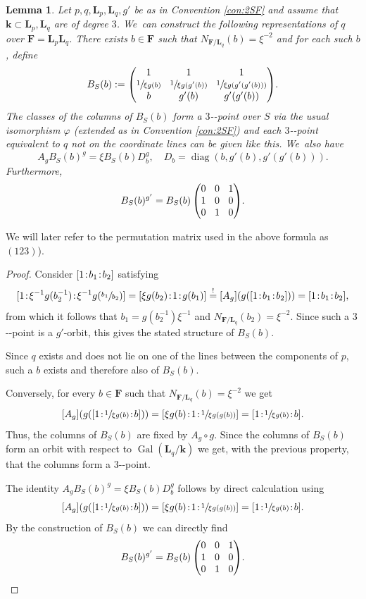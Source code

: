 \documentclass[10pt,a4paper]{amsart}
\providecommand{\nobreakdash}{\nobreak\hbox{-}}
\newcommand{\sep}{\mkern2mu{:}\mkern2mu}
\DeclareMathOperator{\diag}{diag}
\DeclareMathOperator{\Gal}{Gal}
\newtheorem{lemma}[theorem]{Lemma}
\theoremstyle{definition}
\newcommand{\kk}{{\boldsymbol{k}}}
\newcommand{\FF}{{\boldsymbol{F}}}
\newcommand{\LL}{{\boldsymbol{L}}}
\begin{document}
\begin{lemma} \label{3-pointNonEq}
Let $p,q,\LL_p,\LL_q,g'$ be as in Convention \ref{con:2SF} and assume that $\kk \subset \LL_p, \LL_q$ are of degree $3$. We~can construct the following representations of $q$ over $\FF = \LL_p \LL_q$. There exists $b \in \FF$ such that $N_{\FF / \LL_q}(b) = \xi^{-2}$ and for each such $b$, define
\[\arraycolsep4.5pt
B_S(b) := \begin{pmatrix}
1 & 1 & 1 \\
\sfrac{1}{\xi g(b)} & \sfrac{1}{\xi g(g'(b))} & \sfrac{1}{\xi g(g'(g'(b)))} \\
b & g'(b) & g'(g'(b))
\end{pmatrix}\!.
\]
The classes of the columns of $B_S(b)$ form a $3$\nobreakdash-point over $S$ via the usual isomorphism $\varphi$ (extended as in Convention \ref{con:2SF}) and each $3$\nobreakdash-point equivalent to $q$ not on the coordinate lines can be given like this. We~also have
\[
A_gB_S(b)^g = \xi B_S(b) D_b^g, \quad D_b = \diag(b, g'(b),g'(g'(b))).
\]
Furthermore,
\[\arraycolsep4.5pt
B_S(b)^{g'} = B_S(b) \begin{pmatrix}
0 & 0 & 1 \\
1 & 0 & 0 \\
0 & 1 & 0
\end{pmatrix}\!.
\]
\end{lemma}

We will later refer to the permutation matrix used in the above formula as $(123)$).

\begin{proof}
Consider $[1\sep b_1\sep b_2]$ satisfying
\[
[1\sep \xi^{-1}g(b_2^{-1})\sep  \xi^{-1}g(\sfrac{b_1}{b_2})] = [\xi g(b_2)\sep 1\sep g(b_1)] \stackrel{!}{=} [A_g](g([1\sep b_1\sep b_2])) = [1\sep b_1\sep b_2],
\]
from which it follows that $b_1 = g(b_2^{-1})\xi^{-1}$ and $N_{\FF/\LL_q}(b_2) = \xi^{-2} $. Since such a $3$\nobreakdash-point is a $g'$-orbit, this gives the stated structure of $B_S(b)$.

Since $q$ exists and does not lie on one of the lines between the components of $p$, such a $b$ exists and therefore also of $B_S(b)$.

Conversely, for every $b \in \FF$ such that $N_{\FF / \LL_q}(b) = \xi^{-2}$ we get
\[
[A_g](g([1\sep \sfrac{1}{\xi g(b)}\sep b])) = [\xi g(b)\sep 1\sep \sfrac{1}{\xi g(g(b))}] = [1\sep \sfrac{1}{\xi g(b)}\sep  b].
\]
Thus, the columns of $B_S(b)$ are fixed by $A_g \circ g$. Since the columns of $B_S(b)$ form an orbit with respect to $\Gal(\LL_q/\kk)$ we get, with the previous property, that the columns form a $3$\nobreakdash-point.

The identity $A_gB_S(b)^g = \xi B_S(b) D_b^g$ follows by direct calculation using
\[
[A_g](g([1\sep \sfrac{1}{\xi g(b)}\sep b])) = [\xi g(b)\sep 1\sep \sfrac{1}{\xi g(g(b))}] = [1\sep \sfrac{1}{\xi g(b)}\sep  b].
\]
By the construction of $B_S(b)$ we can directly find
\[\arraycolsep4.5pt
B_S(b)^{g'} = B_S(b) \begin{pmatrix}
0 & 0 & 1 \\
1 & 0 & 0 \\
0 & 1 & 0
\end{pmatrix}\!.\qedhere
\]
\end{proof}
\end{document}
